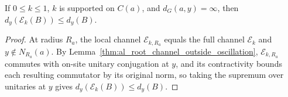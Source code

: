 \begin{lemma}
    \label{thm:qc_component_channel_disconnected}
    \leanok
    If $0\le k\le1$, $k$ is supported on $C(a)$, and
    $d_G(a,y)=\infty$, then $d_y(\mathcal E_k(B))\le d_y(B)$.
\end{lemma}
\begin{proof}
    \leanok
    At radius $R_a$, the local channel $\mathcal E_{k,R_a}$ equals the full
    channel $\mathcal E_k$ and $y\notin N_{R_a}(a)$. By
    Lemma~\ref{thm:al_root_channel_outside_oscillation}, $\mathcal E_{k,R_a}$
    commutes with on-site unitary conjugation at $y$, and its contractivity
    bounds each resulting commutator by its original norm, so taking the
    supremum over unitaries at $y$ gives $d_y(\mathcal E_k(B))\le d_y(B)$.
\end{proof}
